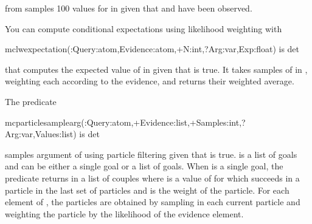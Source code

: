 \documentclass[letterpaper,10pt,english]{sphinxmanual}
\begin{document}
from  samples 100 values for  in  given that  and  have been observed.

You can compute conditional expectations using likelihood weighting with

\begin{sphinxVerbatim}[commandchars=\\\{\}]
mc\PYGZus{}lw\PYGZus{}expectation(:Query:atom,Evidence:atom,+N:int,?Arg:var,\PYGZhy{}Exp:float) is det
\end{sphinxVerbatim}

that computes the expected value of  in  given that  is true.
It takes  samples of  in , weighting each according to the evidence, and returns their weighted average.

The predicate

\begin{sphinxVerbatim}[commandchars=\\\{\}]
mc\PYGZus{}particle\PYGZus{}sample\PYGZus{}arg(:Query:atom,+Evidence:list,+Samples:int,?Arg:var,\PYGZhy{}Values:list) is det
\end{sphinxVerbatim}

samples argument  of  using particle filtering given that  is true.  is a list of goals and  can be either a single goal or a list of goals.
When  is a single goal, the predicate returns in  a list of couples  where  is a value of  for which  succeeds in a particle in the last set of particles and  is the weight of the particle.
For each element of , the particles are obtained by sampling  in each current particle and weighting the particle by the likelihood of the evidence element.
\end{document}

